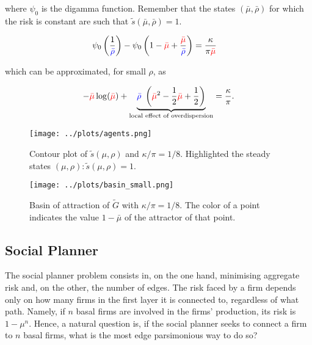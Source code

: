 \documentclass[draft, american, abstract=on]{scrartcl}
\theoremstyle{plain}
\begin{document}
where $\psi_0$ is the digamma function. Remember that the states $(\bar{\mu}, \bar{\rho})$ for which the risk is constant are such that $\tilde{s}(\bar{\mu}, \bar{\rho})= 1$.

\begin{equation}
  \begin{split}
    \psi_0\left(\frac{1}{\textcolor{blue}{\bar{\rho}}} \right) - \psi_0\left(1 - \textcolor{red}{\bar{\mu}} + \frac{ \textcolor{red}{\bar{\mu}} }{\textcolor{blue}{\bar{\rho}}} \right) &= \frac{\kappa}{\pi \textcolor{red}{\bar{\mu}}}
  \end{split}
\end{equation}

which can be approximated, for small $\rho$, as

\begin{equation}
   - \textcolor{red}{\bar{\mu}}\log(\textcolor{red}{\bar{\mu}}) + \underbrace{\textcolor{blue}{\bar{\rho}} \ \left(\textcolor{red}{\bar{\mu}}^2 - \frac{1}{2}\textcolor{red}{\bar{\mu}} + \frac{1}{2}\right)}_{\text{local effect of overdispersion}} = \frac{\kappa}{\pi}.
\end{equation}

\begin{figure}[H]
  \centering
  \texttt{[image: ../plots/agents.png]}
  \caption{Contour plot of $\tilde{s}(\mu, \rho)$ and $\kappa / \pi = 1 / 8$. Highlighted the steady states $(\mu, \rho): \tilde{s}(\mu, \rho) = 1$.}
  \label{fig:agents-optimum}
\end{figure}

\begin{figure}[H]
  \centering
  \texttt{[image: ../plots/basin\_small.png]}
  \caption{Basin of attraction of $\tilde{G}$ with $\kappa / \pi = 1 / 8$. The color of a point indicates the value $1 - \bar{\mu}$ of the attractor of that point.}
  \label{fig:basin-plot}
\end{figure}


\subsection{Social Planner}

The social planner problem consists in, on the one hand, minimising aggregate risk and, on the other, the number of edges. The risk faced by a firm depends only on how many firms in the first layer it is connected to, regardless of what path. Namely, if $n$ basal firms are involved in the firms' production, its risk is $1 - \mu^n$. Hence, a natural question is, if the social planner seeks to connect a firm to $n$ basal firms, what is the most edge parsimonious way to do so? 
\end{document}
